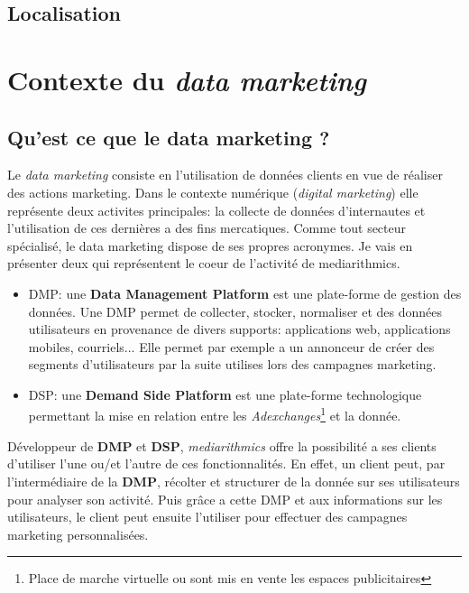        \subsection{Localisation}
    \section{Contexte du \emph{data marketing}}
        \subsection{Qu'est ce que le data marketing ?}
        Le \emph{data marketing} consiste en l'utilisation de données clients en vue de réaliser des actions marketing. 
        Dans le contexte numérique (\emph{digital marketing}) elle représente deux activites principales: la collecte de
        données d'internautes et l'utilisation de ces dernières a des fins mercatiques. Comme tout secteur spécialisé, 
        le data marketing dispose de ses propres acronymes. Je vais en présenter deux qui représentent le coeur de l'activité
        de mediarithmics.
        \begin{itemize}
            \item DMP: une \textbf{Data Management Platform} est une plate-forme de gestion des données. Une DMP permet
            de collecter, stocker, normaliser et des données utilisateurs en provenance de divers supports: applications
            web, applications mobiles, courriels... Elle permet par exemple a un annonceur de créer des segments 
            d'utilisateurs par la suite utilises lors des campagnes marketing.
            \item DSP: une \textbf{Demand Side Platform} est une plate-forme technologique permettant la mise en relation
            entre les \emph{Adexchanges}\footnote{Place de marche virtuelle ou sont mis en vente les espaces publicitaires} et la donnée.
        \end{itemize}
        Développeur de \textbf{DMP} et \textbf{DSP}, \emph{mediarithmics} offre la possibilité a ses clients d'utiliser 
        l'une ou/et l'autre de ces fonctionnalités. En effet, un client peut, par l'intermédiaire de la 
        \textbf{DMP}, récolter et structurer de la donnée sur ses utilisateurs pour analyser son activité. 
        Puis grâce a cette DMP et aux informations sur les utilisateurs, le client peut ensuite l'utiliser pour 
        effectuer des campagnes marketing personnalisées.